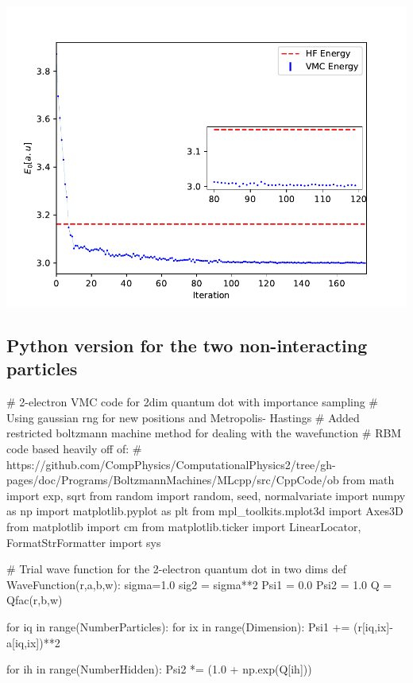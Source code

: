 \documentclass[%
oneside,                 %
final,                   %
10pt]{article}
\begin{document}
\centerline{\includegraphics[width=0.9\linewidth]{figures/figN2.pdf}}

\vspace{6mm}




\subsection{Python version for the two non-interacting particles}

\bpycod
# 2-electron VMC code for 2dim quantum dot with importance sampling
# Using gaussian rng for new positions and Metropolis- Hastings 
# Added restricted boltzmann machine method for dealing with the wavefunction
# RBM code based heavily off of:
# https://github.com/CompPhysics/ComputationalPhysics2/tree/gh-pages/doc/Programs/BoltzmannMachines/MLcpp/src/CppCode/ob
from math import exp, sqrt
from random import random, seed, normalvariate
import numpy as np
import matplotlib.pyplot as plt
from mpl_toolkits.mplot3d import Axes3D
from matplotlib import cm
from matplotlib.ticker import LinearLocator, FormatStrFormatter
import sys



# Trial wave function for the 2-electron quantum dot in two dims
def WaveFunction(r,a,b,w):
    sigma=1.0
    sig2 = sigma**2
    Psi1 = 0.0
    Psi2 = 1.0
    Q = Qfac(r,b,w)
    
    for iq in range(NumberParticles):
        for ix in range(Dimension):
            Psi1 += (r[iq,ix]-a[iq,ix])**2
            
    for ih in range(NumberHidden):
        Psi2 *= (1.0 + np.exp(Q[ih]))
        
\end{document}
